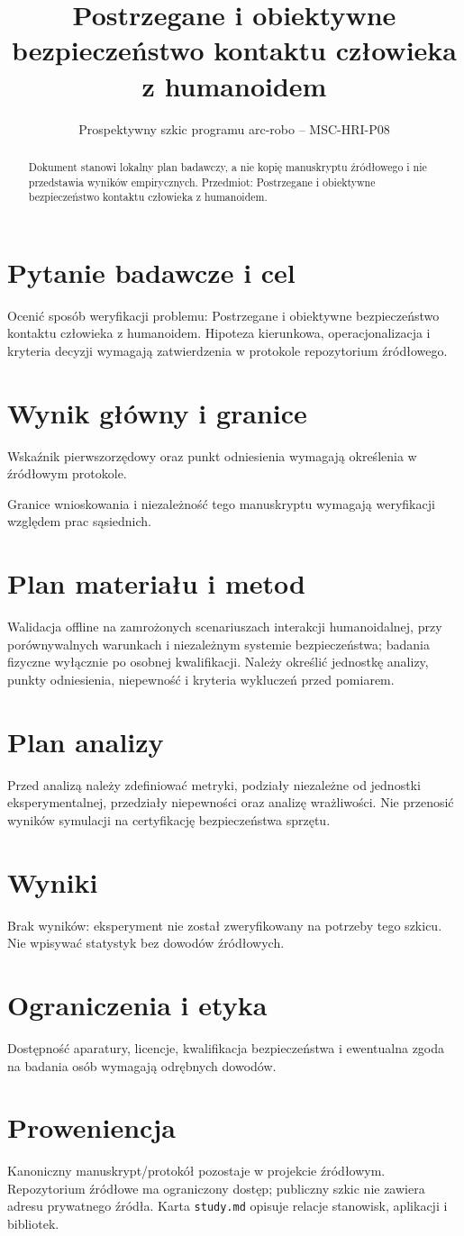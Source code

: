 \documentclass[11pt,a4paper]{article}
\title{Postrzegane i obiektywne bezpieczeństwo kontaktu człowieka z humanoidem}
\author{}
\date{Prospektywny szkic programu arc-robo -- MSC-HRI-P08}
\begin{document}
\maketitle
\begin{abstract}
Dokument stanowi lokalny plan badawczy, a nie kopię manuskryptu źródłowego i nie przedstawia wyników empirycznych. Przedmiot: Postrzegane i obiektywne bezpieczeństwo kontaktu człowieka z humanoidem.
\end{abstract}
\section{Pytanie badawcze i cel}
Ocenić sposób weryfikacji problemu: Postrzegane i obiektywne bezpieczeństwo kontaktu człowieka z humanoidem. Hipoteza kierunkowa, operacjonalizacja i kryteria decyzji wymagają zatwierdzenia w protokole repozytorium źródłowego.
\section{Wynik główny i granice}
Wskaźnik pierwszorzędowy oraz punkt odniesienia wymagają określenia w źródłowym protokole.

Granice wnioskowania i niezależność tego manuskryptu wymagają weryfikacji względem prac sąsiednich.
\section{Plan materiału i metod}
Walidacja offline na zamrożonych scenariuszach interakcji humanoidalnej, przy porównywalnych warunkach i niezależnym systemie bezpieczeństwa; badania fizyczne wyłącznie po osobnej kwalifikacji. Należy określić jednostkę analizy, punkty odniesienia, niepewność i kryteria wykluczeń przed pomiarem.
\section{Plan analizy}
Przed analizą należy zdefiniować metryki, podziały niezależne od jednostki eksperymentalnej, przedziały niepewności oraz analizę wrażliwości. Nie przenosić wyników symulacji na certyfikację bezpieczeństwa sprzętu.
\section{Wyniki}
Brak wyników: eksperyment nie został zweryfikowany na potrzeby tego szkicu. Nie wpisywać statystyk bez dowodów źródłowych.
\section{Ograniczenia i etyka}
Dostępność aparatury, licencje, kwalifikacja bezpieczeństwa i ewentualna zgoda na badania osób wymagają odrębnych dowodów.
\section{Proweniencja}
Kanoniczny manuskrypt/protokół pozostaje w projekcie źródłowym. Repozytorium źródłowe ma ograniczony dostęp; publiczny szkic nie zawiera adresu prywatnego źródła. Karta \texttt{study.md} opisuje relacje stanowisk, aplikacji i bibliotek.
\end{document}
